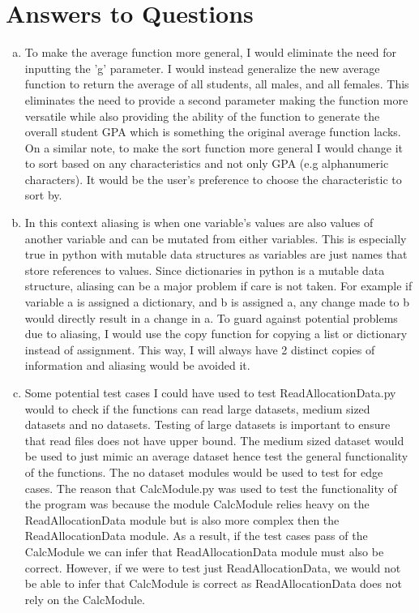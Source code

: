\documentclass[12pt]{article}
\begin{document}

\section{Answers to Questions}

\begin{enumerate}[(a)]

\item To make the average function more general, I would eliminate the need for inputting the 'g' parameter. I would instead generalize the new average function to return the average of all students, all males, and all females. This eliminates the need to provide a second parameter making the function more versatile while also providing the ability of the function to generate the overall student GPA which is something the original average function lacks. On a similar note, to make the sort function more general I would change it to sort based on any characteristics and not only GPA (e.g alphanumeric characters). It would be the user's preference to choose the characteristic to sort by.

\item In this context aliasing is when one variable's values are also values of another variable and can be mutated from either variables. This is especially true in python with mutable data structures as variables are just names that store references to values. Since dictionaries in python is a mutable data structure, aliasing can be a major problem if care is not taken. For example if variable a is assigned a dictionary, and b is assigned a, any change made to b would directly result in a change in a. To guard against potential problems due to aliasing, I would use the copy function for copying a list or dictionary instead of assignment. This way, I will always have 2 distinct copies of information and aliasing would be avoided it.

\item Some potential test cases I could have used to test ReadAllocationData.py would to check if the functions can read large datasets, medium sized datasets and no datasets. Testing of large datasets is important to ensure that read files does not have upper bound. The medium sized dataset would be used to just mimic an average dataset hence test the general functionality of the functions. The no dataset modules would be used to test for edge cases. The reason that CalcModule.py was used to test the functionality of the program was because the module CalcModule relies heavy on the ReadAllocationData module but is also more complex then the ReadAllocationData module. As a result, if the test cases pass of the CalcModule we can infer that ReadAllocationData module must also be correct. However, if we were to test just ReadAllocationData, we would not be able to infer that CalcModule is correct as ReadAllocationData does not rely on the CalcModule.


\end{enumerate}
\end{document}
